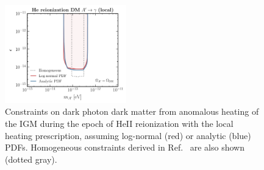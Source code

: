 \documentclass[prd,aps,10pt,nofootinbib,twocolumn,superscriptaddress,preprintnumbers,balancelastpage,longbibliography]{revtex4-1}
\begin{document}
%
\begin{figure}[htbp]
    \centering
    \includegraphics[width=0.47\textwidth]{plots/limit_DP_DM_local}
    \caption{Constraints on dark photon dark matter from anomalous heating of the IGM during the epoch of HeII reionization with the local heating prescription, assuming log-normal (red) or analytic (blue) PDFs. Homogeneous constraints derived in Ref.~\cite{McDermott:2019lch} are also shown (dotted gray).~} 
    \label{fig:limit_DP_DM_local}
\end{figure}
%



\end{document}
